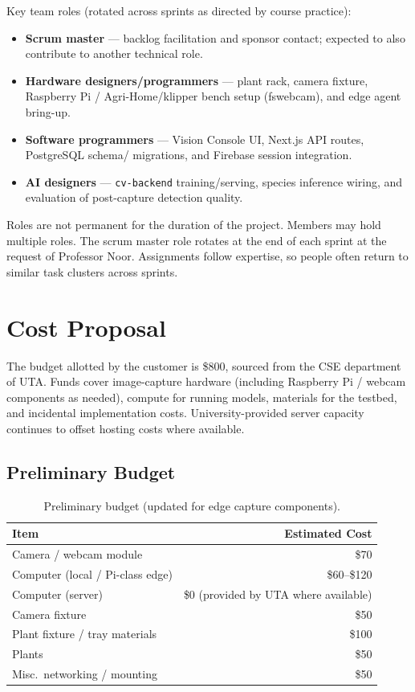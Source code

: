 \documentclass[11pt,letterpaper]{article}
\begin{document}
Key team roles (rotated across sprints as directed by course practice):
\begin{itemize}
  \item \textbf{Scrum master} --- backlog facilitation and sponsor contact; expected to also contribute
        to another technical role.
  \item \textbf{Hardware designers/programmers} --- plant rack, camera fixture, Raspberry Pi /
        Agri-Home/klipper bench setup (fswebcam), and edge agent bring-up.
  \item \textbf{Software programmers} --- Vision Console UI, Next.js API routes, PostgreSQL schema/
        migrations, and Firebase session integration.
  \item \textbf{AI designers} --- \texttt{cv-backend} training/serving, species inference wiring, and
        evaluation of post-capture detection quality.
\end{itemize}

Roles are not permanent for the duration of the project. Members may hold multiple roles. The scrum
master role rotates at the end of each sprint at the request of Professor Noor. Assignments follow
expertise, so people often return to similar task clusters across sprints.

\section{Cost Proposal}
The budget allotted by the customer is \$800, sourced from the CSE department of UTA. Funds cover
image-capture hardware (including Raspberry Pi / webcam components as needed), compute for
running models, materials for the testbed, and incidental implementation costs. University-provided
server capacity continues to offset hosting costs where available.

\subsection{Preliminary Budget}
\begin{table}[H]
\centering
\begin{tabular}{@{}lr@{}}
\toprule
\textbf{Item} & \textbf{Estimated Cost} \\
\midrule
Camera / webcam module & \$70 \\
Computer (local / Pi-class edge) & \$60--\$120 \\
Computer (server) & \$0 (provided by UTA where available) \\
Camera fixture & \$50 \\
Plant fixture / tray materials & \$100 \\
Plants & \$50 \\
Misc.\ networking / mounting & \$50 \\
\bottomrule
\end{tabular}
\caption{Preliminary budget (updated for edge capture components).}
\label{tab:budget}
\end{table}
\end{document}
